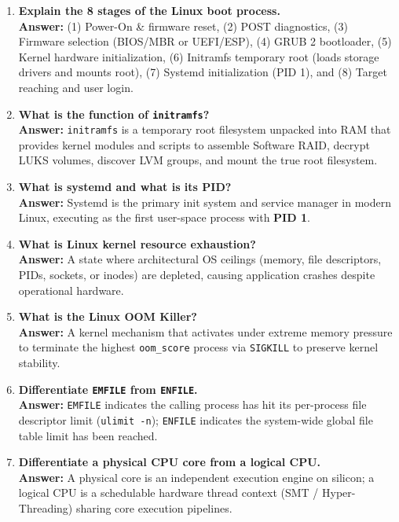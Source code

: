 \begin{enumerate}[label=\textbf{Q\arabic*.},leftmargin=1.2cm]
\item \textbf{Explain the 8 stages of the Linux boot process.} \\
\textbf{Answer:} (1) Power-On \& firmware reset, (2) POST diagnostics, (3) Firmware selection (BIOS/MBR or UEFI/ESP), (4) GRUB 2 bootloader, (5) Kernel hardware initialization, (6) Initramfs temporary root (loads storage drivers and mounts root), (7) Systemd initialization (PID 1), and (8) Target reaching and user login.

\item \textbf{What is the function of \texttt{initramfs}?} \\
\textbf{Answer:} \texttt{initramfs} is a temporary root filesystem unpacked into RAM that provides kernel modules and scripts to assemble Software RAID, decrypt LUKS volumes, discover LVM groups, and mount the true root filesystem.

\item \textbf{What is systemd and what is its PID?} \\
\textbf{Answer:} Systemd is the primary init system and service manager in modern Linux, executing as the first user-space process with \textbf{PID 1}.

\item \textbf{What is Linux kernel resource exhaustion?} \\
\textbf{Answer:} A state where architectural OS ceilings (memory, file descriptors, PIDs, sockets, or inodes) are depleted, causing application crashes despite operational hardware.

\item \textbf{What is the Linux OOM Killer?} \\
\textbf{Answer:} A kernel mechanism that activates under extreme memory pressure to terminate the highest \texttt{oom\_score} process via \texttt{SIGKILL} to preserve kernel stability.

\item \textbf{Differentiate \texttt{EMFILE} from \texttt{ENFILE}.} \\
\textbf{Answer:} \texttt{EMFILE} indicates the calling process has hit its per-process file descriptor limit (\texttt{ulimit -n}); \texttt{ENFILE} indicates the system-wide global file table limit has been reached.

\item \textbf{Differentiate a physical CPU core from a logical CPU.} \\
\textbf{Answer:} A physical core is an independent execution engine on silicon; a logical CPU is a schedulable hardware thread context (SMT / Hyper-Threading) sharing core execution pipelines.


\end{enumerate}
